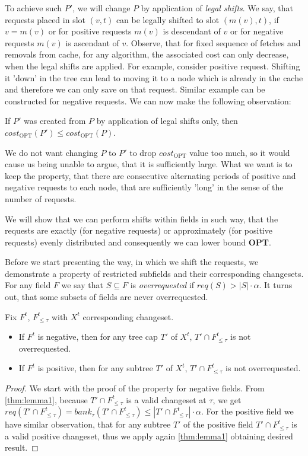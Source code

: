 To achieve such $P'$, we will change $P$ by application of \textit{legal shifts}. 
We say, that requests placed in slot $(v, t)$ can be legally shifted to slot $(m(v), t)$,
if $v = m(v)$ or for positive requests $m(v)$ is descendant of $v$ or for negative 
requests $m(v)$ is ascendant of $v$. Observe, that for fixed sequence of fetches 
and removals from cache, for any algorithm, the associated cost can only decrease, 
when the legal shifts are applied. For example, consider positive request. 
Shifting it 'down' in the tree can lead to moving it to a node which is already 
in the cache and therefore we can only save on that request. Similar example can 
be constructed for negative requests. We can now make the following observation:
\begin{observe}
If $P'$ was created from $P$ by application of legal shifts only, then 
$cost_{\mathrm{OPT}}(P') \leq cost_{\mathrm{OPT}}(P)$.
\end{observe}

We do not want changing $P$ to $P'$ to drop $cost_{\mathrm{OPT}}$ value too 
much, so it would cause us being unable to argue, that it is sufficiently large.
What we want is to keep the property, that there are consecutive alternating
periods of positive and negative requests to each node, that are sufficiently
'long' in the sense of the number of requests. 

We will show that we can perform shifts within fields in such way, 
that the requests are exactly (for negative requests) or approximately (for 
positive 
requests) evenly distributed and consequently we can lower bound \textbf{OPT}.

Before we start presenting the way, in which we shift the requests, we
demonstrate a property of restricted subfields and their corresponding changesets.
For any field $F$ we say that $S \subseteq F$ is \textit{overrequested}
if $req(S) > |S| \cdot \alpha$. It turns out, that some subsets of fields
are never overrequested.
\begin{lemma}
Fix $F^t$, $F^t_{\leq \tau}$ with $X^t$ corresponding changeset.
\begin{itemize}
 \item If $F^t$ is negative, then for any tree cap $T'$ of $X^t$, $T' \cap 
F^t_{\leq \tau}$ is not overrequested.
\item If $F^t$ is positive, then for any subtree $T'$ of $X^t$, $T'\cap F^t_{\leq \tau}$ is not 
overrequested.
\end{itemize}
\label{thm:not_over_requested}
\end{lemma}
\begin{proof}
We start with the proof of the property for negative fields. 
From \ref{thm:lemma1}, because $T' \cap  F^t_{\leq \tau}$ is a valid 
changeset at $\tau$, we get $req(T' \cap  F^t_{\leq \tau}) = bank_{\tau}(T' 
\cap F^t_{\leq \tau}) \leq |T' \cap F^t_{\leq \tau}| \cdot \alpha$. For the positive
field we have similar observation, that for any subtree $T'$ of the positive field
$T'\cap F^t_{\leq \tau}$ is a valid positive changeset, thus we apply again
\ref{thm:lemma1} obtaining desired result.
\end{proof}

